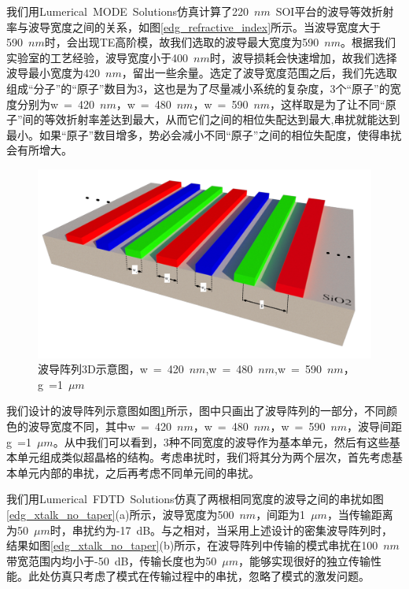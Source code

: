我们用Lumerical~MODE~Solutions\cite{modesolution}仿真计算了220~$nm$~SOI平台的波导等效折射率与波导宽度之间的关系，如图\ref{edg_refractive_index}所示。当波导宽度大于590~$nm$时，会出现TE高阶模，故我们选取的波导最大宽度为590~$nm$。根据我们实验室的工艺经验，波导宽度小于400~$nm$时，波导损耗会快速增加，故我们选择波导最小宽度为420~$nm$，留出一些余量。选定了波导宽度范围之后，我们先选取组成“分子”的“原子”数目为3，这也是为了尽量减小系统的复杂度，3个“原子”的宽度分别为w~=~420~$nm$，w~=~480~$nm$，w~=~590~$nm$，这样取是为了让不同“原子”间的等效折射率差达到最大，从而它们之间的相位失配达到最大,串扰就能达到最小。如果“原子”数目增多，势必会减小不同“原子”之间的相位失配度，使得串扰会有所增大。

\begin{figure}[htb]
	\centering
	\includegraphics[width=14cm]{./Pictures/edg_dpwg.jpg}
	\captionsetup{justification=centering}
	\caption{波导阵列3D示意图，w~=~420~$nm$,w~=~480~$nm$,w~=~590~$nm$，g~=1~$\mu m$}
	\label{edg_dpwg}
\end{figure}

我们设计的波导阵列示意图如图\ref{edg_dpwg}所示，图中只画出了波导阵列的一部分，不同颜色的波导宽度不同，其中w~=~420~$nm$，w~=~480~$nm$，w~=~590~$nm$，波导间距g~=1~$\mu m$。从中我们可以看到，3种不同宽度的波导作为基本单元，然后有这些基本单元组成类似超晶格的结构。考虑串扰时，我们将其分为两个层次，首先考虑基本单元内部的串扰，之后再考虑不同单元间的串扰。

我们用Lumerical~FDTD~Solutions\cite{fdtdsolution}仿真了两根相同宽度的波导之间的串扰如图\ref{edg_xtalk_no_taper}(a)所示，波导宽度为500~$nm$，间距为1~$\mu m$，当传输距离为50~$\mu m$时，串扰约为-17~dB。与之相对，当采用上述设计的密集波导阵列时，结果如图\ref{edg_xtalk_no_taper}(b)所示，在波导阵列中传输的模式串扰在100~$nm$带宽范围内均小于-50~dB，传输长度也为50~$\mu m$，能够实现很好的独立传输性能。此处仿真只考虑了模式在传输过程中的串扰，忽略了模式的激发问题。

